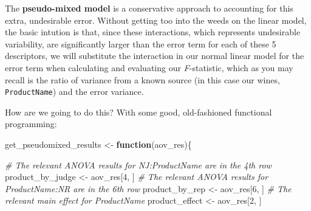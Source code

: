 \documentclass[
]{book}
\newenvironment{Shaded}{\begin{snugshade}}{\end{snugshade}}
\newcommand{\CommentTok}[1]{\textcolor[rgb]{0.56,0.35,0.01}{\textit{#1}}}
\newcommand{\ControlFlowTok}[1]{\textcolor[rgb]{0.13,0.29,0.53}{\textbf{#1}}}
\newcommand{\DecValTok}[1]{\textcolor[rgb]{0.00,0.00,0.81}{#1}}
\newcommand{\NormalTok}[1]{#1}
\newcommand{\OtherTok}[1]{\textcolor[rgb]{0.56,0.35,0.01}{#1}}
\begin{document}
The \textbf{pseudo-mixed model} is a conservative approach to accounting for this extra, undesirable error. Without getting too into the weeds on the linear model, the basic intution is that, since these interactions, which represents undesirable variability, are significantly larger than the error term for each of these 5 descriptors, we will substitute the interaction in our normal linear model for the error term when calculating and evaluating our \emph{F}-statistic, which as you may recall is the ratio of variance from a known source (in this case our wines, \texttt{ProductName}) and the error variance.

How are we going to do this? With some good, old-fashioned functional programming:

\begin{Shaded}
\begin{Highlighting}[]
\NormalTok{get\_pseudomixed\_results }\OtherTok{\textless{}{-}} \ControlFlowTok{function}\NormalTok{(aov\_res)\{}
  
  \CommentTok{\# The relevant ANOVA results for NJ:ProductName are in the 4th row}
\NormalTok{  product\_by\_judge }\OtherTok{\textless{}{-}}\NormalTok{ aov\_res[}\DecValTok{4}\NormalTok{, ]}
  \CommentTok{\# The relevant ANOVA results for ProductName:NR are in the 6th row}
\NormalTok{  product\_by\_rep }\OtherTok{\textless{}{-}}\NormalTok{ aov\_res[}\DecValTok{6}\NormalTok{, ]}
  \CommentTok{\# The relevant main effect for ProductName}
\NormalTok{  product\_effect }\OtherTok{\textless{}{-}}\NormalTok{ aov\_res[}\DecValTok{2}\NormalTok{, ]}
  

\end{Highlighting}
\end{Shaded}
\end{document}
